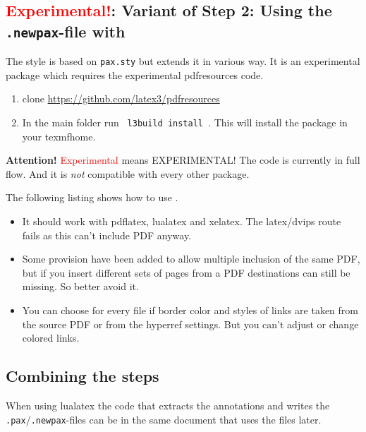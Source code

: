 \documentclass[DIV=12,parskip=half-,bibliography=totoc]{scrartcl}
\begin{document}


\subsection[Alternative Step 2: Using the \texttt{.newpax}-file with \pkg{newpax.sty}]
{\textcolor{red}{Experimental!}: Variant of Step 2: Using the \texttt{.newpax}-file with }


The style  is based on \texttt{pax.sty} but extends it in various way. It is an experimental package which requires the experimental pdfresources code.

\begin{enumerate}
\item clone \url{https://github.com/latex3/pdfresources}
\item In the main folder run \lstinline+ l3build install +. This will install the package in your texmfhome.
\end{enumerate}

\textbf{Attention!} \textcolor{red}{Experimental} means EXPERIMENTAL! The code is currently in full flow. And it is \emph{not} compatible with every other package.

The following listing shows how to use .

\begin{itemize}
\item It should work with pdflatex, lualatex and xelatex. The latex/dvips route fails as this can't include PDF anyway.
\item Some provision have been added to allow multiple inclusion of the same PDF, but if you insert different sets of pages from a PDF destinations can still be missing. So better avoid it.
\item You can choose for every file if border color and styles of links are taken from the source PDF or from the hyperref settings. But you can't adjust or change colored links.
\end{itemize}




\subsection{Combining the steps}

When using lualatex the code that extracts the annotations and writes the \texttt{.pax}/\texttt{.newpax}-files can be in the same document that uses the files later.
\end{document}
